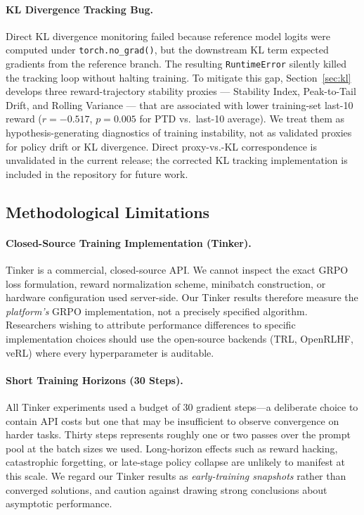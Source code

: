 \documentclass{article}
\begin{document}
\paragraph{KL Divergence Tracking Bug.}
Direct KL divergence monitoring failed because reference model logits were
computed under \texttt{torch.no\_grad()}, but the downstream KL term expected
gradients from the reference branch. The resulting \texttt{RuntimeError}
silently killed the tracking loop without halting training.
To mitigate this gap, Section~\ref{sec:kl} develops three
reward-trajectory stability proxies --- Stability Index, Peak-to-Tail
Drift, and Rolling Variance --- that are associated with lower
training-set last-10 reward ($r = -0.517$, $p = 0.005$ for PTD vs.\
last-10 average). We treat them as hypothesis-generating diagnostics
of training instability, not as validated proxies for policy drift
or KL divergence. Direct proxy-vs.-KL correspondence is unvalidated
in the current release; the corrected KL tracking implementation is
included in the repository for future work.

\subsection{Methodological Limitations}
\label{sec:method_limits}

\paragraph{Closed-Source Training Implementation (Tinker).}
Tinker is a commercial, closed-source API. We cannot inspect the exact GRPO
loss formulation, reward normalization scheme, minibatch construction, or
hardware configuration used server-side. Our Tinker results therefore measure
the \emph{platform's} GRPO implementation, not a precisely specified algorithm.
Researchers wishing to attribute performance differences to specific
implementation choices should use the open-source backends (TRL, OpenRLHF,
veRL) where every hyperparameter is auditable.

\paragraph{Short Training Horizons (30 Steps).}
All Tinker experiments used a budget of 30 gradient steps---a deliberate choice
to contain API costs but one that may be insufficient to observe convergence
on harder tasks. Thirty steps represents roughly one or two passes over the
prompt pool at the batch sizes we used. Long-horizon effects such as reward
hacking, catastrophic forgetting, or late-stage policy collapse are unlikely
to manifest at this scale. We regard our Tinker results as \emph{early-training
snapshots} rather than converged solutions, and caution against drawing strong
conclusions about asymptotic performance.
\end{document}
